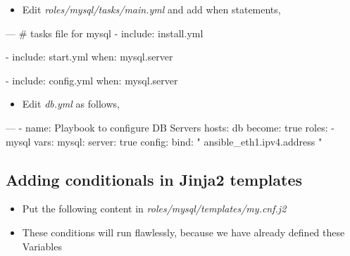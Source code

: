 \begin{itemize}
\item Edit \emph{roles/mysql/tasks/main.yml} and add when statements,
\end{itemize}

\begin{code}
---
# tasks file for mysql
- include: install.yml

- include: start.yml
  when: mysql.server

- include: config.yml
  when: mysql.server
\end{code}

\begin{itemize}
\item Edit \emph{db.yml} as follows,
\end{itemize}

\begin{code}
---
  - name: Playbook to configure DB Servers
    hosts: db
    become: true
    roles:
    - mysql
    vars:
      mysql:
        server: true
        config:
          bind: "{{ ansible_eth1.ipv4.address }}"
\end{code}

\subsection{Adding conditionals in Jinja2 templates}

\begin{itemize}
\item Put the following content in \emph{roles/mysql/templates/my.cnf.j2}
\end{itemize}


\begin{itemize}
\item These conditions will run flawlessly, because we have already defined these Variables
\end{itemize}

